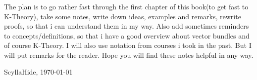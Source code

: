 The plan is to go rather fast through the first chapter of this book(to get fast to K-Theory), take some notes, write down ideas, examples and remarks, rewrite proofs, so that i can understand them in my way. Also add sometimes reminders to concepts/definitions, so that i have a good overview about vector bundles and of course K-Theory. I will also use notation from courses i took in the past. But I will put remarks for the reader.
Hope you will find these notes helpful in any way.

ScyllaHide, \today